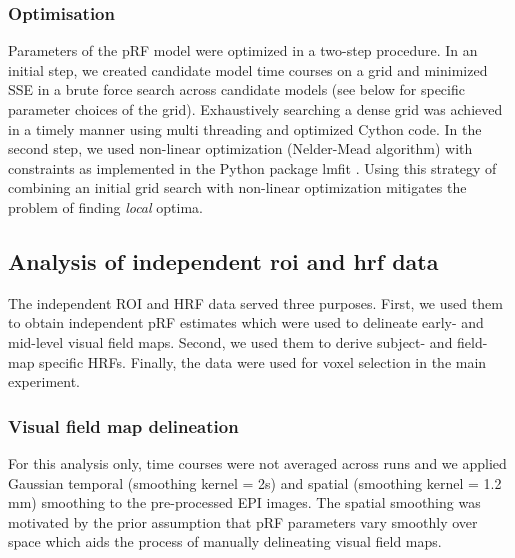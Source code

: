 \subsubsection{Optimisation}
Parameters of the pRF model were optimized in a two-step procedure. In an initial step, we created candidate model time courses on a grid and minimized SSE in a brute force search across candidate models (see below for specific parameter choices of the grid). Exhaustively searching a dense grid was achieved in a timely manner using multi threading and optimized Cython code. In the second step, we used non-linear optimization (Nelder-Mead algorithm) with constraints as implemented in the Python package lmfit \parencite{scipy2001, lmfit2018}. Using this strategy of combining an initial grid search with non-linear optimization mitigates the problem of finding \textit{local} optima.

\subsection{Analysis of independent roi and hrf data}
The independent ROI and HRF data served three purposes. First, we used them to obtain independent pRF estimates which were used to delineate early- and mid-level visual field maps. Second, we used them to derive subject- and field-map specific HRFs. Finally, the data were used for voxel selection in the main experiment.

\subsubsection{Visual field map delineation}
For this analysis only, time courses were not averaged across runs and we applied Gaussian temporal (smoothing kernel = 2s) and spatial (smoothing kernel = 1.2 mm) smoothing to the pre-processed EPI images. The spatial smoothing was motivated by the prior assumption that pRF parameters vary smoothly over space which aids the process of manually delineating visual field maps.

